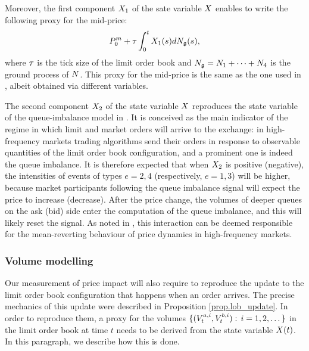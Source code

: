 \documentclass[10pt, article,table]{article}
\begin{document}
Moreover, the first component $\stateVariable_1$ of the sate variable $\stateVariable$ enables to write the following proxy for the mid-price:
\begin{equation}\label{eq.midprice_proxy}
 \midprice_0 + \tickSizeOfLOB \intzerot \stateVariable_1(s) d\groundProc(s),
\end{equation}
where $\tickSizeOfLOB$ is the tick size of the limit order book and $\groundProc = \countingProc[1] + \dots + \countingProc[4]$ is the ground process of $\multiCountingProc$. This proxy for the mid-price  is the same as the one used in \citealp{BM14haw}, albeit obtained via different variables. 

The second component $\stateVariable_2$ of the state variable $\stateVariable$ reproduces the state variable of the queue-imbalance model in \citealp{MP18sta}. It is conceived as the main indicator of the regime in which limit and market orders will arrive to the exchange: in high-frequency markets trading algorithms send their orders in response to observable quantities of the limit order book configuration, and a prominent one is indeed the queue imbalance. It is therefore expected that when $\stateVariable_2$ is positive (negative), the intensities of events of types $e=2,4$ (respectively, $e=1,3$) will be higher, because market participants following the queue imbalance signal will expect the price to increase (decrease). After the price change,  the volumes of deeper queues on the ask (bid) side enter the computation of the queue imbalance, and this will likely reset the signal.  As noted in \citealp{MP18sta}, this interaction can be deemed responsible for the mean-reverting behaviour of price dynamics in high-frequency markets. 


\subsubsection{Volume modelling}
Our measurement of price impact will also require to reproduce the update to the limit order book configuration that happens when an order arrives. The precise mechanics of this update were described in Proposition \ref{prop.lob_update}. In order to reproduce them, a proxy for the volumes $\lbrace (\nthBestAskVolume[i]_t, \nthBestBidVolume[i]_t): \, i=1,2,\dots\rbrace$ in the limit order book at time $t$ needs to be derived from the state variable $\stateVariable(t)$. In this paragraph, we describe how this is done. 
\end{document}
